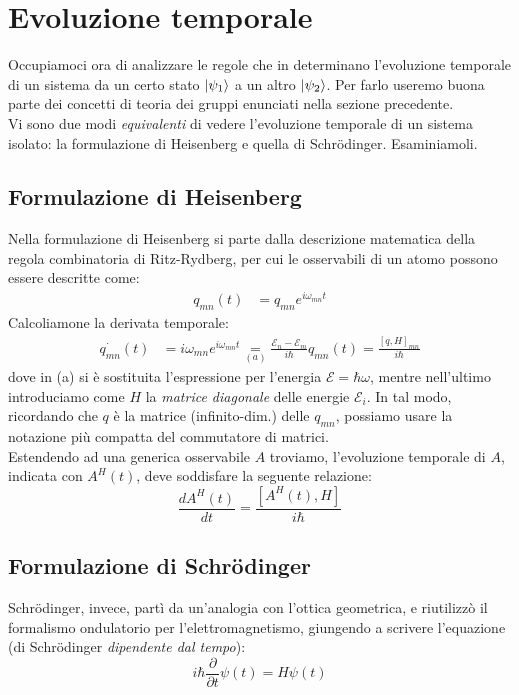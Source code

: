 \documentclass[../../FisicaTeorica.tex]{subfiles}
\begin{document}
\section{Evoluzione temporale}
\label{sec:time-evolution}
Occupiamoci ora di analizzare le regole che in \MQ determinano l'evoluzione temporale di un sistema da un certo stato $\ket{\psi_1}$ a un altro $\ket{\psi_2}$. Per farlo useremo buona parte dei concetti di teoria dei gruppi enunciati nella sezione precedente.\\
Vi sono due modi \textit{equivalenti} di vedere l'evoluzione temporale di un sistema isolato: la formulazione di Heisenberg e quella di Schr\"odinger. Esaminiamoli.

\subsection{Formulazione di Heisenberg}
Nella formulazione di Heisenberg si parte dalla descrizione matematica della regola combinatoria di Ritz-Rydberg, per cui le osservabili di un atomo possono essere descritte come:
\begin{align*}
q_{mn}\left(t\right)&=q_{mn}e^{i\omega_{mn}t}
\end{align*}
Calcoliamone la derivata temporale:
\begin{align*}
\dot{q_{mn}}\left(t\right)&=i\omega_{mn}e^{i\omega_{mn}t}\underset{(a)}{=}
\frac{\mathcal{E}_n-\mathcal{E}_m}{i\hbar}q_{mn}\left(t\right)=\frac{\left[q,H\right]_{mn}}{i\hbar}
\end{align*}
dove in (a) si è sostituita l'espressione per l'energia $\mathcal{E}=\hbar \omega$, mentre nell'ultimo introduciamo come $H$ la \textit{matrice diagonale} delle energie $\mathcal{E}_i$. In tal modo, ricordando che $q$ è la matrice (infinito-dim.) delle $q_{mn}$, possiamo usare la notazione più compatta del commutatore di matrici.\\
Estendendo ad una generica osservabile $A$ troviamo, l'evoluzione temporale di $A$, indicata con $A^H\left(t\right)$, deve soddisfare la seguente relazione:
\[
\frac{dA^H(t)}{dt}=\frac{[A^H(t), H]}{i\hbar}
\]
\subsection{Formulazione di Schrödinger}
Schrödinger, invece, partì da un'analogia con l'ottica geometrica, e riutilizzò il formalismo ondulatorio per l'elettromagnetismo, giungendo a scrivere l'equazione (di Schr\"odinger \textit{dipendente dal tempo}):
\[
i\hbar \frac{\partial}{\partial t} \psi(t) = H\psi(t)
\]
\end{document}
